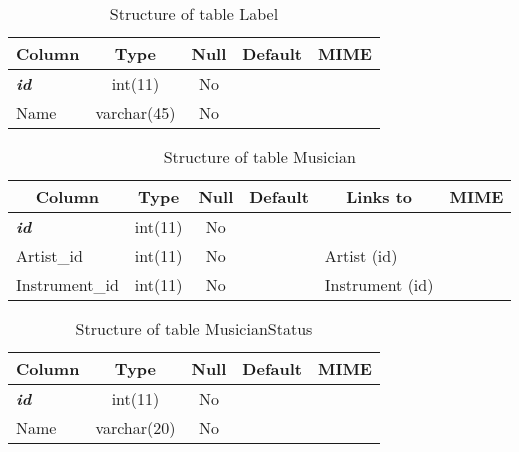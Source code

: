 \documentclass[10pt,a4paper,oneside,notitlepage]{article}
\begin{document}
%
%
 \begin{longtable}{|l|c|c|c|l|} 
 \caption{Structure of table Label} \label{tab:Label-structure} \\
 \hline \multicolumn{1}{|c|}{\textbf{Column}} & \multicolumn{1}{|c|}{\textbf{Type}} & \multicolumn{1}{|c|}{\textbf{Null}} & \multicolumn{1}{|c|}{\textbf{Default}} & \multicolumn{1}{|c|}{\textbf{MIME}} \\ \hline \hline
\textbf{\textit{id}} & int(11) & No &  &  \\ \hline 
Name & varchar(45) & No &  &  \\ \hline 
 \end{longtable}

%
%
 \begin{longtable}{|l|c|c|c|l|l|} 
 \caption{Structure of table Musician} \label{tab:Musician-structure} \\
 \hline \multicolumn{1}{|c|}{\textbf{Column}} & \multicolumn{1}{|c|}{\textbf{Type}} & \multicolumn{1}{|c|}{\textbf{Null}} & \multicolumn{1}{|c|}{\textbf{Default}} & \multicolumn{1}{|c|}{\textbf{Links to}} & \multicolumn{1}{|c|}{\textbf{MIME}} \\ \hline \hline
\textbf{\textit{id}} & int(11) & No &  &  &  \\ \hline 
Artist\_id & int(11) & No &  & Artist (id) &  \\ \hline 
Instrument\_id & int(11) & No &  & Instrument (id) &  \\ \hline 
 \end{longtable}

%
%
 \begin{longtable}{|l|c|c|c|l|} 
 \caption{Structure of table MusicianStatus} \label{tab:MusicianStatus-structure} \\
 \hline \multicolumn{1}{|c|}{\textbf{Column}} & \multicolumn{1}{|c|}{\textbf{Type}} & \multicolumn{1}{|c|}{\textbf{Null}} & \multicolumn{1}{|c|}{\textbf{Default}} & \multicolumn{1}{|c|}{\textbf{MIME}} \\ \hline \hline
\textbf{\textit{id}} & int(11) & No &  &  \\ \hline 
Name & varchar(20) & No &  &  \\ \hline 
 \end{longtable}
\end{document}
